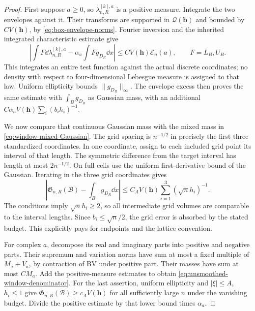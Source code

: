 \begin{proof}
First suppose $a\ge0$, so $\lambda_{n,R}^{[k],a}$ is a positive
measure. Integrate the two envelopes against it. Their transforms
are supported in $\mathcal Q(\mathbf b)$ and bounded by $C V(\mathbf h)$,
by \eqref{eq:box-envelope-norms}. Fourier inversion and the inherited
integrated characteristic estimate give
\[
 \left|\int F\dd\lambda_{n,R}^{[k],a}
               -\alpha_a\int Fg_{D_R}\dd x\right|
       \le C V(\mathbf h)\mathcal E_n(a),\qquad F=L_B,U_B.
\]
This integrates an entire test function against the actual discrete
coordinates; no density with respect to four-dimensional Lebesgue
measure is assigned to that law. Uniform ellipticity bounds
$\|g_{D_R}\|_\infty$. The envelope excess then proves the same
estimate with $\int_Bg_{D_R}$ as Gaussian mass, with an additional
$C\alpha_a V(\mathbf h)\sum_i(b_ih_i)^{-1}$.

We now compare that continuous Gaussian mass with the mixed mass
in \eqref{eq:window-mixed-Gaussian}. The grid spacing is $n^{-1/2}$
in precisely the first three standardized coordinates. In one
coordinate, assign to each included grid point its interval of that
length. The symmetric difference from the target interval has length
at most $2n^{-1/2}$. On full cells use the uniform first-derivative
bound of the Gaussian. Iterating in the three grid coordinates gives
\begin{equation}\label{eq:window-grid-error}
 \left|\mathfrak G_{n,R}(\mathcal B)-\int_Bg_{D_R}\dd x\right|
 \le C_A V(\mathbf h)\sum_{i=1}^3(\sqrt n h_i)^{-1}.
\end{equation}
The conditions imply $\sqrt n h_i\ge2$, so all intermediate grid
volumes are comparable to the interval lengths. Since $b_i\le\sqrt n/2$,
the grid error is absorbed by the stated budget. This explicitly pays
for endpoints and the lattice convention.

For complex $a$, decompose its real and imaginary parts into positive
and negative parts. Their supremum and variation norms have sum at
most a fixed multiple of $M_a+V_a$, by contraction of BV under positive
part. Their masses have sum at most $C M_a$. Add the positive-measure
estimates to obtain \eqref{eq:unsmoothed-window-denominator}.
For the last assertion, uniform ellipticity and $|\xi|\le A$, $h_i\le1$
give $\mathfrak G_{n,R}(\mathcal B)\ge c_A V(\mathbf h)$ for all
sufficiently large $n$ under the vanishing budget. Divide the positive
estimate by that lower bound times $\alpha_a$.
\end{proof}

